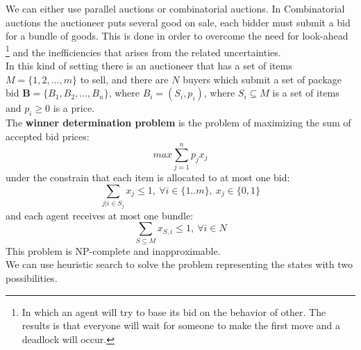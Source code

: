 \documentclass[10pt,a4paper]{article}
\begin{document}
We can either use parallel auctions or combinatorial auctions.
In Combinatorial auctions the auctioneer puts several good on sale, each bidder must submit a bid for a bundle of goods. This is done in order to overcome the need for look-ahead \footnote{In which an agent will try to base its bid on the behavior of other. The results is that everyone will wait for someone to make the first move and a deadlock will occur.} and the inefficiencies that arises from the related uncertainties.\\
In this kind of setting there is an auctioneer that has a set of items $M=	\{1,2,...,m\}$ to sell, and there are $N$ buyers which submit a set of package bid $\mathbf{B}=\{B_1,B_2,...,B_n\}$, where $B_i=(S_i,p_i)$, where $S_i \subseteq M$ is a set of items and $p_i \ge 0$ is a price.\\
The \textbf{winner determination problem} is the problem of maximizing the sum of accepted bid prices:
\[max \sum_{j=1}^np_jx_j\] 
under the constrain that each item is allocated to at most one bid:
\[ \sum_{j|i\in S_j}x_j \le 1,\ \forall i \in \{1..m\},\ x_j \in \{0,1\}\]
and each agent receives at most one bundle:
\[\sum_{S \subseteq M} x_{S,i} \le 1,\ \forall i\in N\]
This problem is NP-complete and inapproximable.\\
We can use heuristic search to solve the problem representing the states with two possibilities.
\end{document}
